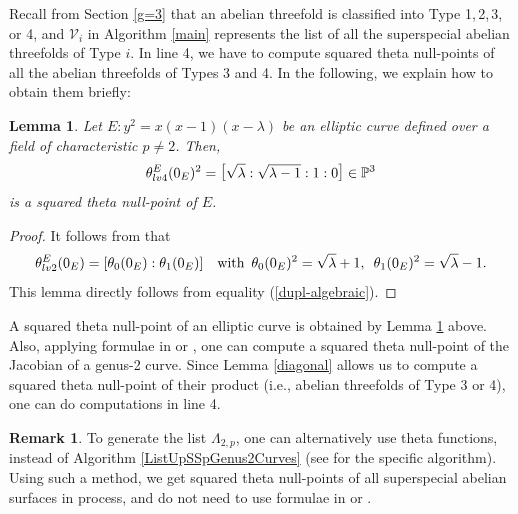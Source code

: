 \documentclass{amsart}
\theoremstyle{definition}
\newtheorem{Rmk}[Def]{Remark}
\theoremstyle{plain}
\newtheorem{Lem}[Def]{Lemma}
\begin{document}
\noindent Recall from Section \ref{g=3} that an abelian threefold is classified into Type 1,\,2,\,3, or 4, and $\mathcal{V}_i$ in Algorithm \ref{main} represents the list of all the superspecial abelian threefolds of Type $i$.
In line 4, we have to compute squared theta null-points of all the abelian threefolds of Types 3 and 4.
In the following, we explain how to obtain them briefly:
{\begin{Lem}\label{ell-correspondence}
Let $E: y^2 = x(x-1)(x-\lambda)$ be an elliptic curve defined over a field of characteristic $p \neq 2$.
Then,
\[
    \theta^E_{\rm lv4}(0_E)^2 = \raisebox{0.4mm}{$\bigl[$}\sqrt{\lambda}:\sqrt{\lambda-1}:1:0\raisebox{0.4mm}{$\bigr]$} \in \mathbb{P}^3\smallskip
\]
is a squared theta null-point of $E$.
\end{Lem}
\begin{proof}
It follows from \cite[Chapter 7, $\S {\rm A}.1$]{Robert} that
\[
    \theta^E_{\rm lv2}(0_E) = [\theta_0(0_E):\theta_1(0_E)] \quad \text{with}\ \,\theta_0(0_E)^2 = \sqrt{\lambda}+1,\ \,\theta_1(0_E)^2 = \sqrt{\lambda}-1.\smallskip
\]
This lemma directly follows from equality (\ref{dupl-algebraic}).
\end{proof}}

A squared theta null-point of an elliptic curve is obtained by Lemma \ref{ell-correspondence} above.
Also, applying formulae in \cite[$\S 7.5$]{Gaudry} or \cite[$\S 5.1$]{CR}, one can compute a squared theta null-point of the Jacobian of a genus-2 curve.
Since Lemma \ref{diagonal} allows us to compute a squared theta null-point of their product (i.e., abelian threefolds of Type 3 or 4), one can do computations in line 4.\vspace{-0.5mm}
\begin{Rmk}
To generate the list $\Lambda_{2,p}$, one can alternatively use theta functions, instead of Algorithm \ref{ListUpSSpGenus2Curves} (see \cite[Algorithm 27]{OOKYN} for the specific algorithm).
Using such a method, we get squared theta null-points of all superspecial abelian surfaces in process, and do not need to use formulae in \cite[$\S 7.5$]{Gaudry} or \cite[$\S 5.1$]{CR}.
\end{Rmk}\smallskip
    
\end{document}
